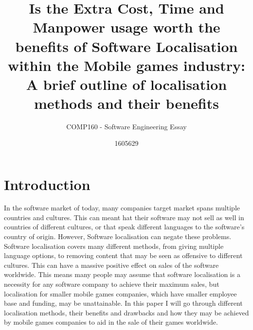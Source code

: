 \documentclass{scrartcl}
\title{Is the Extra Cost, Time and Manpower usage worth the benefits of Software Localisation within the Mobile games industry: A brief outline of localisation methods and their benefits}
\subtitle{COMP160 - Software Engineering Essay}
\author{1605629}
\begin{document}
\maketitle


\section{Introduction}

In the software market of today, many companies target market spans multiple countries and cultures. This can meant hat their software may not sell as well in countries of different cultures, or that speak different languages to the software's country of origin. However, Software localisation can negate these problems. Software localisation covers many different methods, from giving multiple language options, to removing content that may be seen as offensive to different cultures. This can have a massive positive effect on sales of the software worldwide. This means many people may assume that software localisation is a necessity for any software company to achieve their maximum sales, but localisation for smaller mobile games companies, which have smaller employee base and funding, may be unattainable. In this paper I will go through different localisation methods, their benefits and drawbacks and how they may be achieved by mobile games companies to aid in the sale of their games worldwide.
\end{document}
